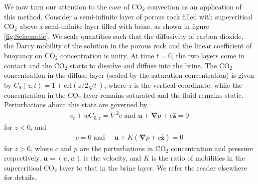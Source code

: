 \documentclass[letterpaper,10pt,prl,twocolumn,aps,reprint,superscriptaddress]{revtex4-1}
\newcommand{\cotwo}{CO$_2$ }
\newcommand{\erf}{\text{erf}}
\newcommand{\bu}{\boldsymbol{u}}
\newcommand{\bz}{\hat{\boldsymbol{z}}}
\newcommand{\grad}{\boldsymbol{\nabla}}
\begin{document}
We now turn our attention to the case of \cotwo convection as an application of this method. 
Consider a semi-infinite layer of porous rock filled with supercritical \cotwo above a semi-infinite layer filled with brine, as shown in figure \ref{fig:Schematic}. 
We scale quantities such that the diffusivity of carbon dioxide, the Darcy mobility of the solution in the porous rock and the linear coefficient of buoyancy on \cotwo concentration is unity. 
At time $t=0$, the two layers come in contact and the \cotwo starts to dissolve and diffuse into the brine. 
The \cotwo concentration in the diffuse layer (scaled by the saturation concentration) is given by $C_0(z,t) = 1 + \erf( {z}/{2\sqrt{t}})$, where $z$ is the vertical coordinate, while the concentration in the \cotwo layer remains saturated and the fluid remains static. 
Perturbations about this state are governed by 
\begin{align}
 c_t + w C_{0,z} = \nabla^2 c \text{ and }
 \bu + \grad p + c\bz = 0
 \label{eqn:linone}
\end{align}
for $z<0$, and 
\begin{align}
 c = 0 \text{ and } \quad \bu + K (\grad p + c\bz) = 0
 \label{eqn:lintwo}
\end{align}
for $z>0$, where $c$ and $p$ are the perturbations in \cotwo concentration and pressure respectively, $\bu = (u,w)$ is the velocity, and $K$ is the ratio of mobilities in the supercritical \cotwo layer to that in the brine layer. 
We refer the reader elsewhere\cite{SlimRama10} for details. 
\end{document}
